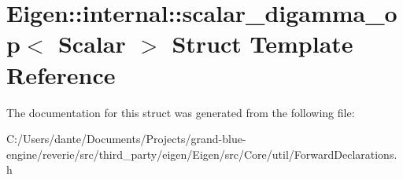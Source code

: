 \hypertarget{struct_eigen_1_1internal_1_1scalar__digamma__op}{}\section{Eigen\+::internal\+::scalar\+\_\+digamma\+\_\+op$<$ Scalar $>$ Struct Template Reference}
\label{struct_eigen_1_1internal_1_1scalar__digamma__op}


The documentation for this struct was generated from the following file\+:\begin{DoxyCompactItemize}
\item 
C\+:/\+Users/dante/\+Documents/\+Projects/grand-\/blue-\/engine/reverie/src/third\+\_\+party/eigen/\+Eigen/src/\+Core/util/Forward\+Declarations.\+h\end{DoxyCompactItemize}
